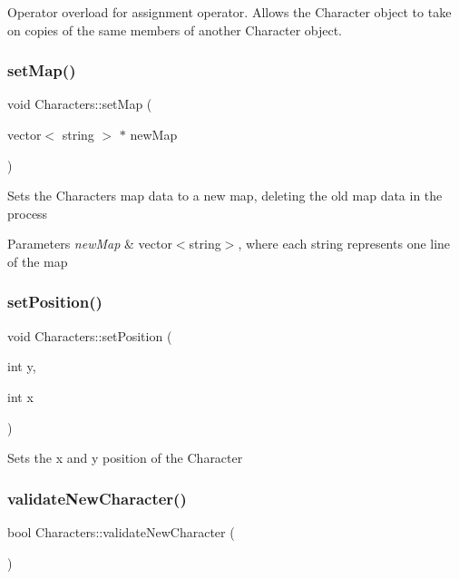 Operator overload for assignment operator. Allows the Character object to take on copies of the same members of another Character object. \hypertarget{class_characters_a7ea2bd80b72476d35173691d31e80727}{}\label{class_characters_a7ea2bd80b72476d35173691d31e80727} 
\subsubsection{\texorpdfstring{set\+Map()}{setMap()}}
{\footnotesize\ttfamily void Characters\+::set\+Map (\begin{DoxyParamCaption}\item[{vector$<$ string $>$ $\ast$}]{new\+Map }\end{DoxyParamCaption})}

Sets the Character\textquotesingle{}s map data to a new map, deleting the old map data in the process 
\begin{DoxyParams}{Parameters}
{\em new\+Map} & vector$<$string$>$, where each string represents one line of the map \\
\hline
\end{DoxyParams}
\hypertarget{class_characters_a9dac165846c7eb9cacb6a2807a75f845}{}\label{class_characters_a9dac165846c7eb9cacb6a2807a75f845} 
\subsubsection{\texorpdfstring{set\+Position()}{setPosition()}}
{\footnotesize\ttfamily void Characters\+::set\+Position (\begin{DoxyParamCaption}\item[{int}]{y,  }\item[{int}]{x }\end{DoxyParamCaption})}

Sets the x and y position of the Character \hypertarget{class_characters_a1273e2d7fe2e959cd3ed513c5717f6b7}{}\label{class_characters_a1273e2d7fe2e959cd3ed513c5717f6b7} 
\subsubsection{\texorpdfstring{validate\+New\+Character()}{validateNewCharacter()}}
{\footnotesize\ttfamily bool Characters\+::validate\+New\+Character (\begin{DoxyParamCaption}{ }\end{DoxyParamCaption})}



